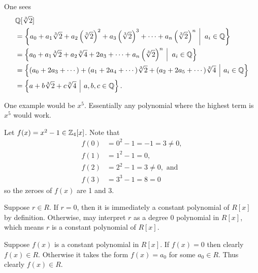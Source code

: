 \begin{questions}
    \item One sees
    {
        \fontsize{8.5pt}{10pt}\selectfont
        \begin{align*}
            &\Q[\sqrt[3]{2}]\\
            &= \left\{a_0 + a_1\sqrt[3]{2} + a_2\left(\sqrt[3]{2}\right)^2 + a_3\left(\sqrt[3]{2}\right)^3 + \cdots + a_n\left(\sqrt[3]{2}\right)^n \vert a_i \in \Q\right\}\\
            &= \left\{a_0 + a_1\sqrt[3]{2} + a_2\sqrt[3]{4} + 2a_3 + \cdots + a_n\left(\sqrt[3]{2}\right)^n \vert a_i \in \Q\right\}\\
            &= \left\{(a_0 + 2a_3 + \cdots) + (a_1 + 2a_4 + \cdots)\sqrt[3]{2} + (a_2 + 2a_5 + \cdots)\sqrt[3]{4} \vert a_i \in \Q\right\}\\
            &= \left\{a + b\sqrt[3]{2} + c\sqrt[3]{4} \vert a,b,c \in \Q\right\}.
        \end{align*}
    }

    \item One example would be $x^5$. Essentially any polynomial where the highest term is $x^5$ would work.

    \item Let $f(x) = x^2 - 1 \in \mathbb{Z}_4[x]$. Note that
    \begin{align*}
        f(0) &= 0^2 - 1 = -1 = 3 \neq 0,\\
        f(1) &= 1^2 - 1 = 0,\\
        f(2) &= 2^2 - 1 = 3 \neq 0, \text{ and}\\
        f(3) &= 3^3 - 1 = 8 = 0
    \end{align*}
    so the zeroes of $f(x)$ are 1 and 3.

    \item \begin{partquestions}{\alph*}
        \item Suppose $r \in R$. If $r = 0$, then it is immediately a constant polynomial of $R[x]$ by definition. Otherwise, may interpret $r$ as a degree 0 polynomial in $R[x]$, which means $r$ is a constant polynomial of $R[x]$.

        \item Suppose $f(x)$ is a constant polynomial in $R[x]$. If $f(x) = 0$ then clearly $f(x) \in R$. Otherwise it takes the form $f(x) = a_0$ for some $a_0 \in R$. Thus clearly $f(x) \in R$.
    \end{partquestions}


\end{questions}
